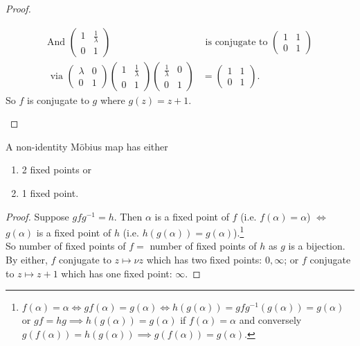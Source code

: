 \begin{proof}
\begin{enumerate}
\begin{align*}
            \text{And } \begin{pmatrix}1 & \frac{1}{\lambda} \\0 & 1\end{pmatrix} &\text{ is conjugate to } \begin{pmatrix}1 & 1 \\0 & 1\end{pmatrix} \\ 
            \text{ via } \begin{pmatrix}\lambda & 0 \\ 0 & 1 \end{pmatrix}  \begin{pmatrix}1 & \frac{1}{\lambda} \\0 & 1\end{pmatrix} \begin{pmatrix}\frac{1}{\lambda} & 0 \\ 0 & 1 \end{pmatrix} &= \begin{pmatrix}1 & 1 \\0 & 1\end{pmatrix}.
        \end{align*}
        So $f$ is conjugate to $g$ where $g(z) = z + 1$.
    \end{enumerate} 
\end{proof} 

\begin{corollary} \label{cor:8}
    A non-identity M\"obius map has either 
    \begin{enumerate}
        \item 2 fixed points or
        \item 1 fixed point.
    \end{enumerate} 
\end{corollary} 

\begin{proof}
    Suppose $g f g^{-1} = h$.
    Then $\alpha$ is a fixed point of $f$ (i.e. $f(\alpha) = \alpha$) $\iff$ $g(\alpha)$ is a fixed point of $h$ (i.e. $h(g(\alpha)) = g(\alpha)$).\footnote{$f(\alpha) = \alpha \iff gf(\alpha) = g(\alpha) \iff h(g(\alpha)) = gfg^{-1}(g(\alpha)) = g(\alpha)$ or $g f = h g \implies h(g(\alpha)) = g(\alpha)$ if $f(\alpha) = \alpha$ and conversely $g(f(\alpha)) = h(g(\alpha)) \implies g(f(\alpha)) = g(\alpha)$.} \\
    So number of fixed points of $f = $ number of fixed points of $h$ as $g$ is a bijection.
    By  either, $f$ conjugate to $z \mapsto \nu z$ which has two fixed points: $0, \infty$; or $f$ conjugate to $z \mapsto z + 1$ which has one fixed point: $\infty$.
\end{proof} 

